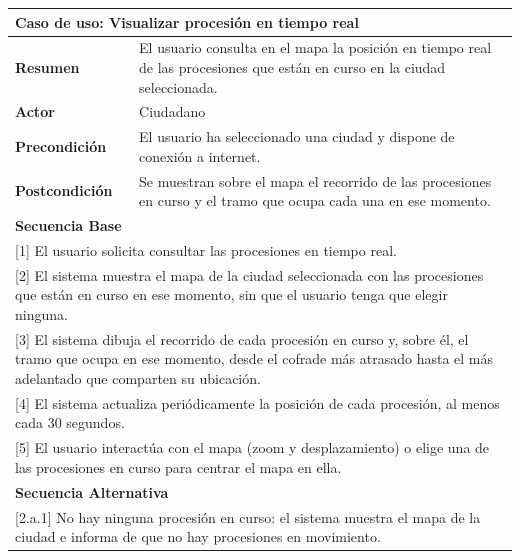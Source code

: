 \begin{table}[h!]
    \centering
    \renewcommand{\arraystretch}{1.5}

    \begin{tabular}{|p{4cm}|p{11cm}|}
        \hline
        \multicolumn{2}{|l|}{\textbf{Caso de uso: Visualizar procesión en tiempo real}} \\
        \hline
        \textbf{Resumen} & El usuario consulta en el mapa la posición en tiempo real de las procesiones que están en curso en la ciudad seleccionada. \\
        \hline
        \textbf{Actor} & Ciudadano \\
        \hline
        \textbf{Precondición} & El usuario ha seleccionado una ciudad y dispone de conexión a internet. \\
        \hline
        \textbf{Postcondición} & Se muestran sobre el mapa el recorrido de las procesiones en curso y el tramo que ocupa cada una en ese momento. \\
        \hline
        \multicolumn{2}{|l|}{\textbf{Secuencia Base}} \\
        \hline
        \multicolumn{2}{|p{15cm}|}{ [1] El usuario solicita consultar las procesiones en tiempo real. } \\
        \hline
        \multicolumn{2}{|p{15cm}|}{ [2] El sistema muestra el mapa de la ciudad seleccionada con las procesiones que están en curso en ese momento, sin que el usuario tenga que elegir ninguna. } \\
        \hline
        \multicolumn{2}{|p{15cm}|}{ [3] El sistema dibuja el recorrido de cada procesión en curso y, sobre él, el tramo que ocupa en ese momento, desde el cofrade más atrasado hasta el más adelantado que comparten su ubicación. } \\
        \hline
        \multicolumn{2}{|p{15cm}|}{ [4] El sistema actualiza periódicamente la posición de cada procesión, al menos cada 30 segundos. } \\
        \hline
        \multicolumn{2}{|p{15cm}|}{ [5] El usuario interactúa con el mapa (zoom y desplazamiento) o elige una de las procesiones en curso para centrar el mapa en ella. } \\
        \hline
        \multicolumn{2}{|l|}{\textbf{Secuencia Alternativa}} \\
        \hline
        \multicolumn{2}{|p{15cm}|}{ [2.a.1] No hay ninguna procesión en curso: el sistema muestra el mapa de la ciudad e informa de que no hay procesiones en movimiento. } \\

\end{tabular}
\end{table}
